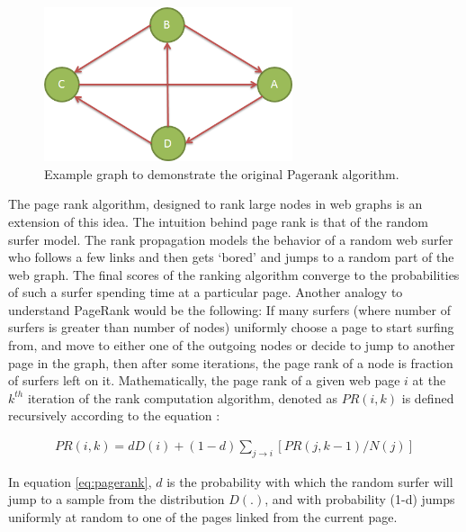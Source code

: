 \begin{figure}[t]
\centering
\includegraphics[width=0.65\textwidth]{media/chapter6/pr-example-graph.png}
\caption{Example graph to demonstrate the original Pagerank algorithm.}
\label{fig:pr-graph-example}
\end{figure}

The page rank \cite{page1999pagerank} algorithm, designed to rank large nodes in web graphs is an extension of this idea. The intuition behind page rank is that of the random surfer model. The rank propagation models the behavior of a random web surfer who follows a few links and then gets `bored' and jumps to a random part of the web graph. The final scores of the ranking algorithm converge to the probabilities of such a surfer spending time at a particular page. Another analogy to understand PageRank would be the following: If many surfers (where number of surfers is greater than number of nodes) uniformly choose a page to start surfing from, and move to either one of the outgoing nodes or decide to jump to another page in the graph, then after some iterations, the page rank of a node is fraction of surfers left on it. Mathematically, the page rank of a given web page $i$ at the $k^{th}$ iteration of the rank computation algorithm, denoted as $PR(i, k)$ is defined recursively according to the equation \cite{borodin2001finding}:

\begin{align}
\label{eq:pagerank}
PR(i, k) = dD(i) + (1 - d) \sum_{j \rightarrow i} [PR(j, k - 1)/N(j)]
\end{align}

In equation \ref{eq:pagerank}, $d$ is the probability with which the random surfer will jump to a sample from the distribution $D(.)$, and with probability (1-d) jumps uniformly at random to one of the pages linked from the current page.

